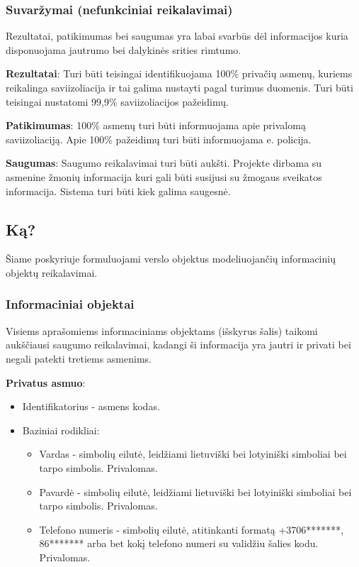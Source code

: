 \documentclass{VUMIFPSkursinis}
\begin{document}
\subsubsection{Suvaržymai (nefunkciniai reikalavimai)}
Rezultatai, patikimumas bei saugumas yra labai svarbūs dėl informacijos kuria disponuojama jautrumo bei dalykinės srities rimtumo.

\textbf{Rezultatai}:
Turi būti teisingai identifikuojama 100\% privačių asmenų, kuriems reikalinga saviizoliacija ir tai galima nustayti pagal turimus duomenis. 
Turi būti teisingai nustatomi 99,9\% saviizoliacijos pažeidimų.

\textbf{Patikimumas}:
100\% asmenų turi būti informuojama apie privalomą saviizoliaciją. Apie 100\% pažeidimų turi būti informuojama e. policija.

\textbf{Saugumas}:
Saugumo reikalavimai turi būti aukšti. Projekte dirbama su asmenine žmonių informacija kuri gali būti susijusi su žmogaus sveikatos informacija. Sistema turi būti kiek galima saugesnė.

\subsection{Ką?}\label{sec:vartotojoWhat}
Šiame poskyriuje formuluojami verslo objektus modeliuojančių informacinių objektų reikalavimai.

\subsubsection{Informaciniai objektai}

Visiems aprašomiems informaciniams objektams (išskyrus šalis) taikomi aukščiausi saugumo reikalavimai, kadangi ši informacija yra jautri ir privati bei negali patekti tretiems asmenims.

\noindent\textbf{Privatus asmuo}:
\begin{itemize}
	\item Identifikatorius - asmens kodas.
	\item Baziniai rodikliai:
	\begin{itemize}
		\item Vardas - simbolių eilutė, leidžiami lietuviški bei lotyiniški simboliai bei tarpo simbolis. Privalomas.
		\item Pavardė - simbolių eilutė, leidžiami lietuviški bei lotyiniški simboliai bei tarpo simbolis. Privalomas.
		\item Telefono numeris - simbolių eilutė, atitinkanti formatą +3706*******, 86******* arba bet kokį telefono numeri su validžiu šalies kodu. Privalomas.
	\end{itemize}
\end{itemize}
\end{document}
